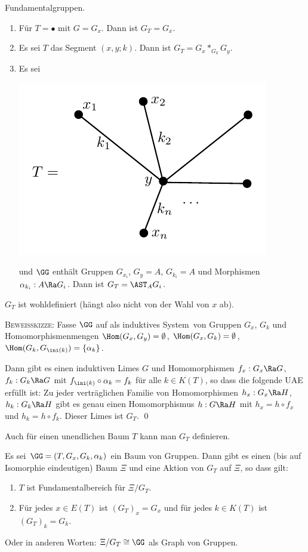 \BSP Fundamentalgruppen.
\begin{enumerate}
\item Für $T=\bullet$ mit $G=G_x$. Dann ist $G_T=G_x$.
\item Es sei $T$ das Segment $(x,y;k)$.
Dann ist $G_T=G_x *_{G_k} G_y$.
\item Es sei
\begin{center}
	\includegraphics{grugraImages/GT1}
\end{center}
und $\GG$ enthält Gruppen $G_{x_i}$, $G_y=A$, $G_{k_i}=A$ und
Morphismen $\alpha_{k_i}:A\Ra G_i$.
Dann ist $G_T = \AST_A G_i$.
\end{enumerate}

\BEM $G_T$ ist wohldefiniert (hängt also nicht von der Wahl von
$x$ ab).

\textsc{Beweisskizze:} Fasse $\GG$ auf als \glqq induktives
System\grqq\
von Gruppen $G_x$, $G_k$ und Homomorphismenmengen $\Hom(G_x,G_y)=\emptyset$,
$\Hom(G_x,G_k)=\emptyset$, $\Hom(G_k,G_{\ini(k)})=\{\alpha_k\}$.

Dann gibt es einen induktiven Limes $G$ und Homomorphismen
$f_x:G_x\Ra G$, $f_k:G_k\Ra G$ mit
$f_{\ini(k)}\circ \alpha_k = f_k$ für alle $k\in K(T)$, so dass
die folgende UAE erfüllt ist: Zu jeder verträglichen Familie
von Homomorphismen $h_x:G_x\Ra H$, $h_k:G_k\Ra H$ gibt es genau einen
Homomorphismus $h:G\Ra H$ mit $h_x=h\circ f_x$ und $h_k=h\circ f_k$.
Dieser Limes ist $G_T$.
\qed

\FOLG Auch für einen unendlichen Baum $T$ kann man $G_T$ definieren.

\PROP\label{prop_BvG}
Es sei $\GG=(T,G_x,G_k,\alpha_k)$ ein Baum von Gruppen.
Dann gibt es einen (bis auf Isomorphie eindeutigen) Baum $\Xi$
und eine Aktion von $G_T$ auf $\Xi$, so dass gilt:
\begin{enumerate}
\item $T$ ist Fundamentalbereich für $\Xi/G_T$.
\item Für jedes $x\in E(T)$ ist $(G_T)_x = G_x$ und für jedes
$k\in K(T)$ ist $(G_T)_k = G_k$.
\end{enumerate}
Oder in anderen Worten: $\Xi/G_T \cong \GG$ als Graph von Gruppen.


